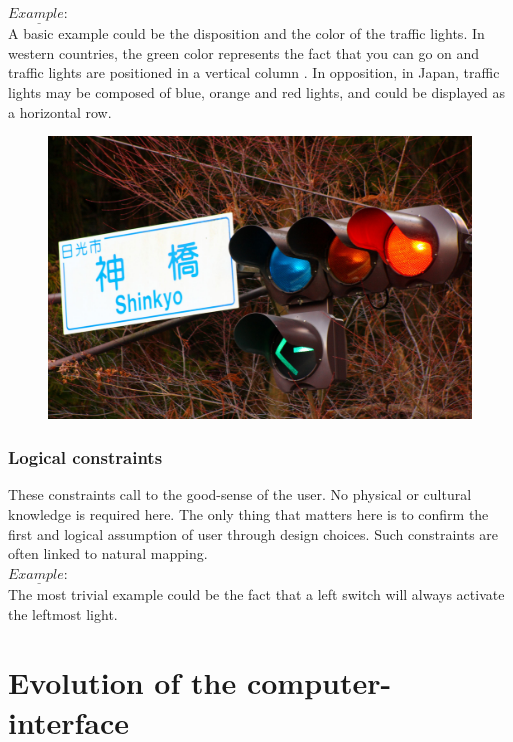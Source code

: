 \documentclass[a4paper,11pt] {article}
\theoremstyle{definition}
\begin{document}
        $\underline{Example:}$\\
        A basic example could be the disposition and the color of the traffic lights. In western countries, the green color represents the fact that you can go on and traffic lights are positioned in a vertical column . In opposition, in Japan, traffic lights may be composed of blue, orange and red lights, and could be displayed as a horizontal row.
        \begin{figure}[h]
        \centering
        \includegraphics[scale=0.1]{fig-report/japan-traffic-light.jpg}
        \end{figure}

        \subsubsection{Logical constraints}
        These constraints call to the good-sense of the user. No physical or cultural knowledge is required here. The only thing that matters here is to confirm the first and logical assumption of user through design choices. Such constraints are often linked to natural mapping.\\

        $\underline{Example:}$\\
        The most trivial example could be the fact that a left switch will always activate the leftmost light.




\section{Evolution of the computer-interface}
\label{sct:history}
\end{document}
